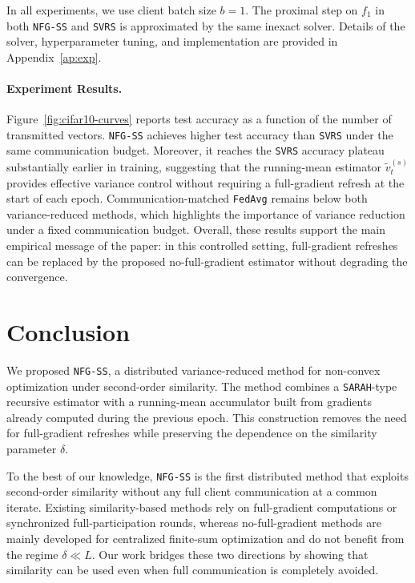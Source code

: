 \documentclass{article}
\begin{document}
In all experiments, we use client batch size $b=1$. The proximal step on $f_1$ in both \texttt{NFG-SS} and \texttt{SVRS} is approximated by the same inexact solver. Details of the solver, hyperparameter tuning, and implementation are provided in Appendix~\ref{ap:exp}.

\paragraph{Experiment Results.}
\label{sec:exp-results}

Figure~\ref{fig:cifar10-curves} reports test accuracy as a function of the number of transmitted vectors. \texttt{NFG-SS} achieves higher test accuracy than \texttt{SVRS} under the same communication budget. Moreover, it reaches the \texttt{SVRS} accuracy plateau substantially earlier in training, suggesting that the running-mean estimator $\tilde v_t^{(s)}$ provides effective variance control without requiring a full-gradient refresh at the start of each epoch. Communication-matched \texttt{FedAvg} remains below both variance-reduced methods, which highlights the importance of variance reduction under a fixed communication budget. Overall, these results support the main empirical message of the paper: in this controlled setting, full-gradient refreshes can be replaced by the proposed no-full-gradient estimator without degrading the convergence.

\section{Conclusion}

We proposed \texttt{NFG-SS}, a distributed variance-reduced method for non-convex optimization under second-order similarity. The method combines a \texttt{SARAH}-type recursive estimator with a running-mean accumulator built from gradients already computed during the previous epoch. This construction removes the need for full-gradient refreshes while preserving the dependence on the similarity parameter $\delta$.

To the best of our knowledge, \texttt{NFG-SS} is the first distributed method that exploits second-order similarity without any full client communication at a common iterate. Existing similarity-based methods rely on full-gradient computations or synchronized full-participation rounds, whereas no-full-gradient methods are mainly developed for centralized finite-sum optimization and do not benefit from the regime $\delta \ll L$. Our work bridges these two directions by showing that similarity can be used even when full communication is completely avoided.
\end{document}
